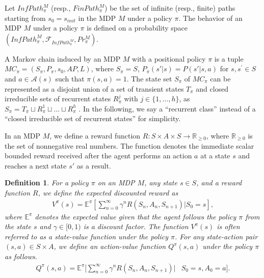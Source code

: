 \documentclass[letterpaper, 10 pt, conference]{ieeeconf}  %
\newtheorem{definition}{Definition}
\begin{document}
Let $InfPath^{M}_{\pi}$ (resp., $FinPath^{M}_{\pi}$) be the set of infinite (resp., finite) paths starting from $s_0=s_{init}$ in the MDP $M$ under a policy $\pi$. The behavior of an MDP $M$ under a policy $\pi$ is defined on a probability space $(InfPath^{M}_{\pi}, \mathcal{F}_{InfPath^{M}_{\pi}}, Pr^{M}_{\pi})$. %

A Markov chain induced by an MDP $M$ with a positional policy $\pi$ is a tuple $MC_{\pi} = (S_{\pi},P_{\pi},s_0,AP,L)$, where $S_{\pi} = S$, $P_{\pi}(s'|s) = P(s'|s,a)$ for $s, s^{\prime} \in S$ and $a \in \mathcal{A}(s)$ such that $\pi(s,a) = 1$.
The state set $S_{\pi}$ of $MC_{\pi}$ can be represented as a disjoint union of a set of transient states $T_{\pi}$ and closed irreducible sets of recurrent states $R^j_{\pi}$ with $j \in \{ 1, \ldots ,h \}$, as $ S_{\pi} = T_{\pi} \sqcup R^1_{\pi} \sqcup \ldots \sqcup R^h_{\pi} $ \cite{ESS}.
In the following, we say a ``recurrent class'' instead of a ``closed irreducible set of recurrent states'' for simplicity.

In an MDP $M$, we define a reward function $R:S \times A \times S \rightarrow \mathbb{R}_{\geq0}$, where $\mathbb{R}_{\geq0}$ is the set of nonnegative real numbers. The function denotes the immediate scalar bounded reward received after the agent performs an action $a$ at a state $s$ and reaches a next state $s'$ as a result.

\begin{definition}
  For a policy $\pi$ on an MDP $M$, any state $s \in S$, and a reward function $R$, we define the expected discounted reward as
  \begin{align*}
    V^{\pi}(s)= \mathbb{E}^{\pi}[\sum_{n=0}^{\infty}\gamma^n R(S_n, A_n, S_{n+1})|S_0 = s],
  \end{align*}
where $\mathbb{E}^{\pi}$ denotes the expected value given that the agent follows the policy $\pi$ from the state $s$ and $\gamma \in [0,1)$ is a discount factor. The function $V^{\pi}(s)$ is often referred to as a state-value function under the policy $\pi$. For any state-action pair $(s,a) \in S \times A$, we define an action-value function $Q^{\pi}(s,a)$ under the policy $\pi$ as follows.
  \begin{align*}
    Q^{\pi}(s,a)= \mathbb{E}^{\pi}[\sum_{n=0}^{\infty}\gamma^n R(S_n, A_n, S_{n+1})|&S_0 = s, A_0 = a].
  \end{align*}
\end{definition}
\end{document}
